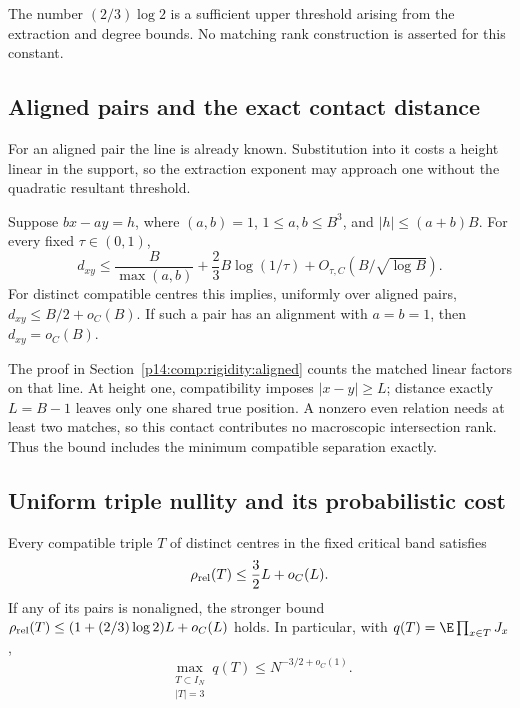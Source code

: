 The number $(2/3)\log2$ is a sufficient upper threshold
arising from the extraction and degree bounds.  No matching
rank construction is asserted for this constant.


\subsection{Aligned pairs and the exact contact distance}

For an aligned pair the line is already known.  Substitution into it
costs a height linear in the support, so the extraction exponent may
approach one without the quadratic resultant threshold.

\begin{proposition}
\label{p13:rig:aligned}
Suppose $bx-ay=h$, where $(a,b)=1$, $1\le a,b\le B^3$,
and $|h|\le(a+b)B$.  For every fixed $\tau\in(0,1)$,
\begin{equation}
 d_{xy}\le\frac B{\max(a,b)}+\frac23B\log(1/\tau)
                    +O_{\tau,C}(B/\sqrt{\log B}).
 \label{p13:rig:aligned-quantitative}
\end{equation}
For distinct compatible centres this implies, uniformly
over aligned pairs,
$d_{xy}\le B/2+o_C(B)$.  If such a pair has an alignment
with $a=b=1$, then $d_{xy}=o_C(B)$.
\end{proposition}

The proof in Section~\ref{p14:comp:rigidity:aligned} counts the matched
linear factors on that line.  At height one, compatibility imposes
$|x-y|\ge L$; distance exactly $L=B-1$ leaves only one shared true
position.  A nonzero even relation needs at least two matches, so this
contact contributes no macroscopic intersection rank.  Thus the bound
includes the minimum compatible separation exactly.

\subsection{Uniform triple nullity and its probabilistic cost}

\begin{corollary}
\label{p13:rig:triple}
Every compatible triple $T$ of distinct centres in the
fixed critical band satisfies
\begin{equation}
                 \rho_{\rm rel}(T)\le\frac32L+o_C(L).
 \label{p13:rig:triple-nullity}
\end{equation}
If any of its pairs is nonaligned, the stronger bound
$\rho_{\rm rel}(T)\le(1+(2/3)\log2)L+o_C(L)$ holds.
In particular, with $q(T)=\E\prod_{x\in T}J_x$,
\begin{equation}
                  \max_{\substack{T\subset I_N\\|T|=3}}q(T)
                            \le N^{-3/2+o_C(1)}.
 \label{p13:rig:max-triple}
\end{equation}
\end{corollary}


